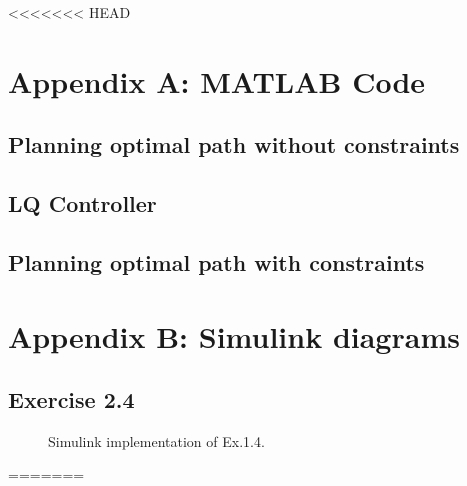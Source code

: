 <<<<<<< HEAD

\begin{appendices}
\section{Appendix A: MATLAB Code}
\label{appendix:A}

\subsection{Planning optimal path without constraints}


\subsection{LQ Controller}


\subsection{Planning optimal path with constraints}




\section{Appendix B: Simulink diagrams}
\label{appendix:B}

\subsection*{Exercise 2.4}
\begin{figure}[h]
    \centering
    \caption{Simulink implementation of Ex.1.4.}
    \label{sim:ex24}
\end{figure}


\end{appendices}
=======



